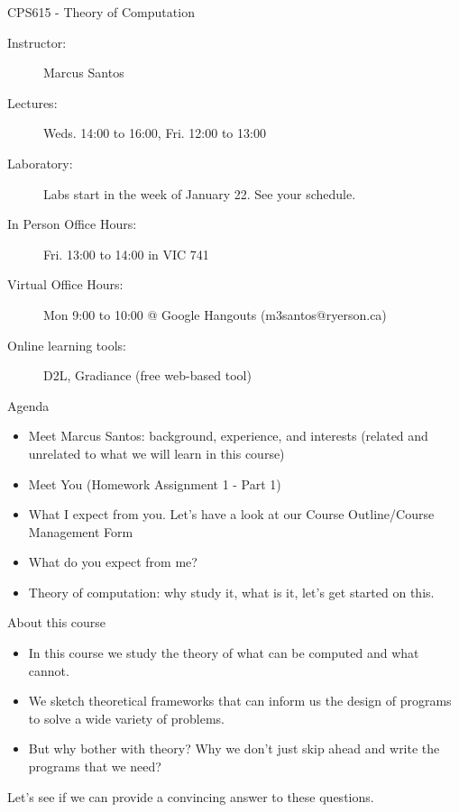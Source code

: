 \documentclass{prosper}%
\newcommand{\quiz}[1]{{\begin{flushright}\small\tt\blue #1 \end{flushright}}}
\begin{document}
\begin{slide}{CPS615 - Theory of Computation}
\begin{description}
\item[Instructor:]  Marcus Santos
\item[Lectures:] Weds. 14:00 to 16:00, Fri. 12:00 to 13:00
\item[Laboratory:] Labs start in the week of January 22. See your schedule. 
\item[In Person Office Hours:] Fri. 13:00 to 14:00 in VIC 741
\item [Virtual Office Hours:] Mon 9:00 to 10:00 @ Google Hangouts (m3santos@ryerson.ca)
\item[Online learning tools:] D2L, Gradiance (free web-based tool)
\end{description}
\end{slide}

\begin{slide}{Agenda}
\begin{itemize}
\item Meet Marcus Santos: background,   experience, and interests  (related and unrelated to what we will learn in this course) 
\item Meet You (Homework Assignment 1 - Part 1)
\item What I expect from you. Let's have a look at our Course Outline/Course Management Form
\item What do you expect from me? 
\item Theory of computation: why study it, what is it, let's get started on this.
\end{itemize}
\end{slide}



\begin{slide}{About this course}
\begin{itemize}
\item In this course we study the theory of what can be computed and what cannot.
\item We sketch theoretical frameworks  that can inform us the design of programs to solve a wide variety of problems.
\item But why bother with theory? Why we don't just skip ahead and write the programs that we need?
\end{itemize}
Let's see if we can provide a convincing answer to these questions.
\end{slide}
\end{document}
